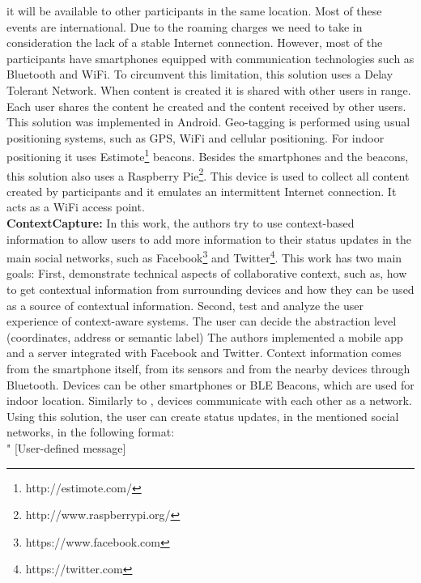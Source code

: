 it will be available to other participants in the same
location.
Most of these events are international. Due to the
roaming charges we need to take in consideration
the lack of a stable Internet connection.
However, most of the participants have smartphones
equipped with communication technologies such as
Bluetooth and WiFi.
To circumvent this limitation, this solution
uses a Delay Tolerant Network.
When content is created it is shared with other
users in range. Each user shares the content he
created and the content received by other users.
This solution was implemented in Android.
Geo-tagging is performed using usual positioning
systems, such as GPS, WiFi and cellular positioning.
For indoor positioning it uses 
Estimote\footnote{http://estimote.com/} beacons.
Besides the smartphones and the beacons, this
solution also uses a 
Raspberry Pie\footnote{http://www.raspberrypi.org/}.
This device is used to collect all content created by
participants and it emulates an intermittent Internet
connection. It acts as a WiFi access point.
\\
\textbf{ContextCapture:}
In this work\cite{Antila2011}, the authors try to use
context-based information to allow users to
add more information to their status updates
in the main social networks, such as
Facebook\footnote{https://www.facebook.com} and 
Twitter\footnote{https://twitter.com}.
This work has two main goals: First, demonstrate technical
aspects of collaborative context, such as,
how to get contextual information from
surrounding devices and how they can be used
as a source of contextual information.
Second, test and analyze the user experience of
context-aware systems.
The user can decide the abstraction level (coordinates,
address or semantic label)
The authors implemented a mobile app and a
server integrated with Facebook and Twitter.
Context information comes from the smartphone itself,
from its sensors and from the nearby devices through
Bluetooth. 
Devices can be other smartphones or BLE Beacons, which
are used for indoor location.
Similarly to \cite{BenAbdesslem2014}, devices communicate
with each other as a network.
Using this solution, the user can create status updates,
in the mentioned social networks, in the following format:
\\
"
[User-defined message] 

